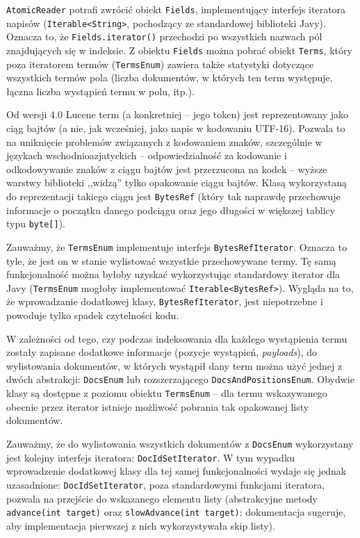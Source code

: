 \texttt{AtomicReader} potrafi zwrócić obiekt \texttt{Fields}, implementujący interfejs iteratora napisów (\texttt{Iterable<String>}, pochodzący ze standardowej biblioteki Javy). Oznacza to, że \texttt{Fields.iterator()} przechodzi po wszystkich nazwach pól znajdujących się w indeksie. Z obiektu \texttt{Fields} można pobrać obiekt \texttt{Terms}, który poza iteratorem termów (\texttt{TermsEnum}) zawiera także statystyki dotyczące wszystkich termów pola (liczba dokumentów, w których ten term występuje, łączna liczba wystąpień termu w polu, itp.).

Od wersji 4.0 Lucene term (a konkretniej -- jego token) jest reprezentowany jako ciąg bajtów (a nie, jak wcześniej, jako napis w kodowaniu UTF-16). Pozwala to na uniknięcie problemów związanych z kodowaniem znaków, szczególnie w językach wschodnioazjatyckich -- odpowiedzialność za kodowanie i odkodowywanie znaków z ciągu bajtów jest przerzucona na kodek -- wyższe warstwy biblioteki ,,widzą'' tylko opakowanie ciągu bajtów. Klasą wykorzystaną do reprezentacji takiego ciągu jest \texttt{BytesRef} (który tak naprawdę przechowuje informacje o początku danego podciągu oraz jego długości w większej tablicy typu \texttt{byte[]}).

Zauważmy, że \texttt{TermsEnum} implementuje interfejs \texttt{BytesRefIterator}. Oznacza to tyle, że jest on w stanie wylistować wszystkie przechowywane termy. Tę samą funkcjonalność można byłoby uzyskać wykorzystując standardowy iterator dla Javy (\texttt{TermsEnum} mogłoby implementować \texttt{Iterable<BytesRef>}). Wygląda na to, że wprowadzanie dodatkowej klasy, \texttt{BytesRefIterator}, jest niepotrzebne i powoduje tylko spadek czytelności kodu.

W zależności od tego, czy podczas indeksowania dla każdego wystąpienia termu zostały zapisane dodatkowe informacje (pozycje wystąpień, \emph{payloads}), do wylistowania dokumentów, w których wystąpił dany term można użyć jednej z dwóch abstrakcji: \texttt{DocsEnum} lub rozszerzającego \texttt{DocsAndPositionsEnum}. Obydwie klasy są dostępne z poziomu obiektu \texttt{TermsEnum} -- dla termu wskazywanego obecnie przez iterator istnieje możliwość pobrania tak opakowanej listy dokumentów.

Zauważmy, że do wylistowania wszystkich dokumentów z \texttt{DocsEnum} wykorzystany jest kolejny interfejs iteratora: \texttt{DocIdSetIterator}. W tym wypadku wprowadzenie dodatkowej klasy dla tej samej funkcjonalności wydaje się jednak uzasadnione: \texttt{DocIdSetIterator}, poza standardowymi funkcjami iteratora, pozwala na przejście do wskazanego elementu listy (abstrakcyjne metody \texttt{advance(int target)} oraz \texttt{slowAdvance(int target)}: dokumentacja sugeruje, aby implementacja pierwszej z nich wykorzystywała skip listy).

